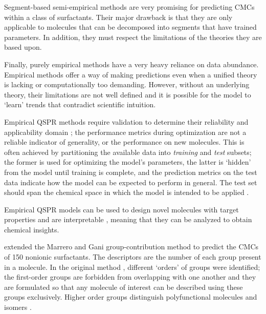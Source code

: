 Segment-based semi-empirical methods are very promising for predicting CMCs
within a class of surfactants. Their major drawback is that they are only
applicable to molecules that can be decomposed into segments that have trained
parameters. In addition, they must respect the limitations of the theories they
are based upon.

Finally, purely empirical methods have a very heavy reliance on data abundance.
Empirical methods offer a way of making predictions even when a unified theory
is lacking or computationally too demanding. However, without an underlying
theory, their limitations are not well defined and it is possible for the model
to `learn' trends that contradict scientific intuition.

Empirical QSPR methods require validation to determine their reliability and
applicability domain
\cite{veerasamyValidationQSARModelsstrategies2011,tropshaBestPracticesQSAR2010,leonardSelectionTrainingTest2006};
the performance metrics during optimization are not a reliable indicator of
generality, or the performance on new molecules. This is often achieved by
partitioning the available data into \emph{training} and \emph{test} subsets;
the former is used for optimizing the model's parameters, the latter is `hidden'
from the model until training is complete, and the prediction metrics on the
test data indicate how the model can be expected to perform in general. The test
set should span the chemical space in which the model is intended to be applied
\cite{leonardSelectionTrainingTest2006}.

Empirical QSPR models can be used to design novel molecules with target
properties
\cite{gantzerInverseQSPRNovoDesign2020,bolboacaMolecularDesignQSARs2013} and are
interpretable \cite{zefirovFragmentalApproachQSPR2002}, meaning that they can be
analyzed to obtain chemical insights.

\citet{matteiModelingCriticalMicelle2013} extended the Marrero and Gani
group-contribution method \cite{ganiAutomaticCreationMissing2005} to predict the
CMCs of 150 nonionic surfactants. The descriptors are the number of each group
present in a molecule. In the original method
\cite{ganiAutomaticCreationMissing2005}, different `orders' of groups were
identified; the first-order groups are forbidden from overlapping with one
another and they are formulated so that any molecule of interest can be
described using these groups exclusively. Higher order groups distinguish
polyfunctional molecules and isomers \cite{ganiAutomaticCreationMissing2005}.

